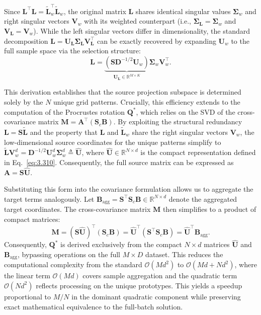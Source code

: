 Since $\mathbf{L}^\top\mathbf{L} = \tilde{\mathbf{L}}_w^\top\tilde{\mathbf{L}}_w$, the original matrix $\mathbf{L}$ shares identical singular values $\mathbf{\Sigma}_w$ and right singular vectors $\mathbf{V}_w$ with its weighted counterpart (i.e., $\mathbf{\Sigma}_\mathbf{L} = \mathbf{\Sigma}_w$ and $\mathbf{V}_{\mathbf{L}} = \mathbf{V}_w$). While the left singular vectors differ in dimensionality, the standard decomposition $\mathbf{L} = \mathbf{U}_\mathbf{L} \mathbf{\Sigma}_\mathbf{L} \mathbf{V}_{\mathbf{L}}^\top$ can be exactly recovered by expanding $\mathbf{U}_w$ to the full sample space via the selection structure:
\begin{equation}
    \mathbf{L} = \underbrace{(\mathbf{S} \mathbf{D}^{-1/2} \mathbf{U}_w)}_{\mathbf{U}_\mathbf{L} \in \mathbb{R}^{M \times K}} \mathbf{\Sigma}_w \mathbf{V}_w^\top.
    \label{eq:recovered_svd_unified}
\end{equation}

This derivation establishes that the source projection subspace is determined solely by the $N$ unique grid patterns. Crucially, this efficiency extends to the computation of the Procrustes rotation $\mathbf{Q}^*$, which relies on the SVD of the cross-covariance matrix $\mathbf{M} = \mathbf{A}^\top (\mathbf{S}_c \mathbf{B})$. By exploiting the structural redundancy $\mathbf{L} = \mathbf{S}\tilde{\mathbf{L}}$ and the property that $\mathbf{L}$ and $\tilde{\mathbf{L}}_w$ share the right singular vectors $\mathbf{V}_w$, the low-dimensional source coordinates for the unique patterns simplify to $\tilde{\mathbf{L}}\mathbf{V}_w^d = \mathbf{D}^{-1/2} \mathbf{U}_w^d \mathbf{\Sigma}_w^d \triangleq \hat{\mathbf{U}}$, where $\hat{\mathbf{U}} \in \mathbb{R}^{N \times d}$ is the compact representation defined in Eq.~\ref{eq:3.310}. Consequently, the full source matrix can be expressed as $\mathbf{A} = \mathbf{S}\hat{\mathbf{U}}$.

Substituting this form into the covariance formulation allows us to aggregate the target terms analogously. Let $\mathbf{B}_{\text{agg}} = \mathbf{S}^\top \mathbf{S}_c \mathbf{B} \in \mathbb{R}^{N \times d}$ denote the aggregated target coordinates. The cross-covariance matrix $\mathbf{M}$ then simplifies to a product of compact matrices:
\begin{equation}
    \mathbf{M} = (\mathbf{S} \hat{\mathbf{U}})^\top (\mathbf{S}_c \mathbf{B}) = \hat{\mathbf{U}}^\top (\mathbf{S}^\top \mathbf{S}_c \mathbf{B}) = \hat{\mathbf{U}}^\top \mathbf{B}_{\text{agg}}.
    \label{eq:final_M}
\end{equation}
Consequently, $\mathbf{Q}^*$ is derived exclusively from the compact $N \times d$ matrices $\hat{\mathbf{U}}$ and $\mathbf{B}_{\text{agg}}$, bypassing operations on the full $M \times D$ dataset. This reduces the computational complexity from the standard $\mathcal{O}(M d^2)$ to $\mathcal{O}(M d + N d^2)$, where the linear term $\mathcal{O}(M d)$ covers sample aggregation and the quadratic term $\mathcal{O}(N d^2)$ reflects processing on the unique prototypes. This yields a speedup proportional to $M/N$ in the dominant quadratic component while preserving exact mathematical equivalence to the full-batch solution.

